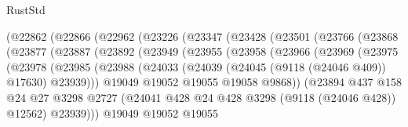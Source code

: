\begin{lexlean}{RustStd}
\begin{coremodule}
                (@22862
                  (@22866
                    (@22962
                      (@23226
                        (@23347
                          (@23428
                            (@23501
                              (@23766
                                (@23868
                                  (@23877
                                    (@23887
                                      (@23892
                                        (@23949
                                          (@23955
                                            (@23958
                                              (@23966
                                                (@23969
                                                  (@23975
                                                    (@23978
                                                      (@23985
                                                        (@23988
                                                          (@24033
                                                            (@24039
                                                              (@24045 (@9118 (@24046 @409)) @17630)
                                                              @23939)))
                                                        @19049
                                                        @19052
                                                        @19055
                                                        @19058
                                                        @9868))
                                                    (@23894
                                                      @437
                                                      @158
                                                      @24
                                                      @27
                                                      @3298
                                                      @2727
                                                      (@24041
                                                        @428
                                                        @24
                                                        @428
                                                        @3298
                                                        (@9118 (@24046 @428))
                                                        @12562)
                                                      @23939)))
                                                @19049
                                                @19052
                                                @19055

\end{coremodule}
\end{lexlean}
